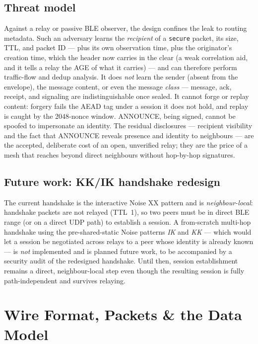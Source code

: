 \documentclass[11pt]{report}
\newcommand{\code}[1]{\texttt{\small #1}}
\begin{document}
\subsection{Threat model}

Against a relay or passive BLE observer, the design confines the leak to routing metadata. Such an adversary learns the \emph{recipient} of a \code{secure} packet, its size, TTL, and packet ID — plus its own observation time, plus the originator's creation time, which the header now carries in the clear (a weak correlation aid, and it tells a relay the AGE of what it carries) — and can therefore perform traffic-flow and dedup analysis. It does \emph{not} learn the sender (absent from the envelope), the message content, or even the message \emph{class} — message, ack, receipt, and signaling are indistinguishable once sealed. It cannot forge or replay content: forgery fails the AEAD tag under a session it does not hold, and replay is caught by the 2048-nonce window. ANNOUNCE, being signed, cannot be spoofed to impersonate an identity. The residual disclosures — recipient visibility and the fact that ANNOUNCE reveals presence and identity to neighbours — are the accepted, deliberate cost of an open, unverified relay; they are the price of a mesh that reaches beyond direct neighbours without hop-by-hop signatures.

\subsection{Future work: KK/IK handshake redesign}

The current handshake is the interactive Noise XX pattern and is \emph{neighbour-local}: handshake packets are not relayed (TTL~1), so two peers must be in direct BLE range (or on a direct UDP path) to establish a session. A from-scratch multi-hop handshake using the pre-shared-static Noise patterns \emph{IK} and \emph{KK} — which would let a session be negotiated across relays to a peer whose identity is already known — is \emph{not} implemented and is planned future work, to be accompanied by a security audit of the redesigned handshake. Until then, session establishment remains a direct, neighbour-local step even though the resulting session is fully path-independent and survives relaying.

\section{Wire Format, Packets \& the Data Model}
\end{document}
